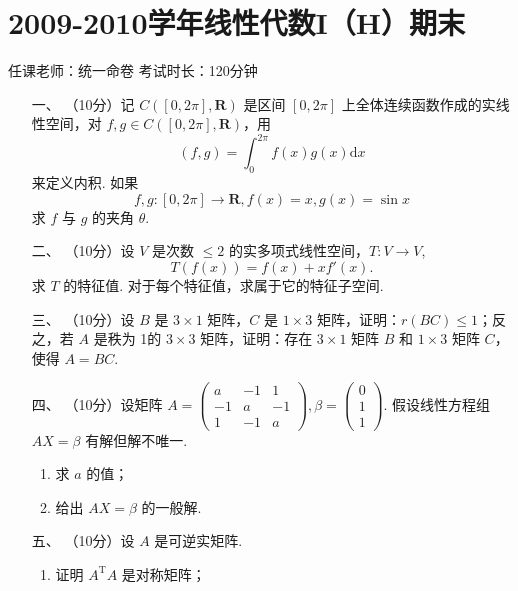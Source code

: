 \section*{2009-2010学年线性代数I（H）期末}

\begin{center}
    任课老师：统一命卷\hspace{4em} 考试时长：120分钟
\end{center}

\begin{enumerate}
    \item [一、]（10分）记 $C([0,2\pi],\mathbf{R})$ 是区间 $[0,2\pi]$ 上全体连续函数作成的实线性空间，对 $f,g \in C([0,2\pi],\mathbf{R})$，用
    \[(f,g) = \displaystyle\int_0^{2\pi}f(x)g(x)\mathrm{d}x\]
    来定义内积. 如果
    \[f,g:[0,2\pi] \to \mathbf{R},f(x)=x,g(x)=\sin x\]
    求 $f$ 与 $g$ 的夹角 $\theta$.

    \item[二、]（10分）设 $V$ 是次数 $\leqslant 2$ 的实多项式线性空间，$T:V\to V$,
    \[T(f(x)) = f(x) + xf'(x).\]
    求 $T$ 的特征值. 对于每个特征值，求属于它的特征子空间.

    \item[三、]（10分）设 $B$ 是 $3\times 1$ 矩阵，$C$ 是 $1\times 3$ 矩阵，证明：$r(BC)\leqslant 1$；反之，若 $A$ 是秩为 1的 $3\times 3$ 矩阵，证明：存在 $3\times 1$ 矩阵 $B$ 和 $1\times 3$ 矩阵 $C$，使得 $A=BC$.

    \item[四、]（10分）设矩阵 $A=\begin{pmatrix}a & -1 & 1 \\ -1 & a & -1 \\ 1 & -1 & a\end{pmatrix},\beta =\begin{pmatrix}0 \\ 1 \\ 1\end{pmatrix}$. 假设线性方程组 $AX=\beta$ 有解但解不唯一.
    \begin{enumerate}[label=(\arabic*)]
        \item 求 $a$ 的值；

        \item 给出 $AX=\beta$ 的一般解.
    \end{enumerate}

\item[五、]（10分）设 $A$ 是可逆实矩阵.
    \begin{enumerate}[label=(\arabic*)]
        \item 证明 $A^{\mathrm{T}}A$ 是对称矩阵；


\end{enumerate}
\end{enumerate}
